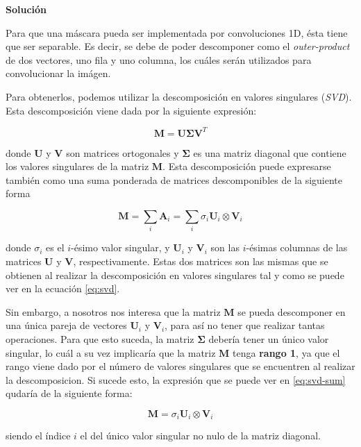 \documentclass[11pt,a4paper]{article}
\newcommand{\answer}{\noindent\textbf{Solución}}
\begin{document}
\answer

Para que una máscara pueda ser implementada por convoluciones 1D, ésta tiene que ser separable. Es decir, se debe de poder
descomponer como el \textit{outer-product} de dos vectores, uno fila y uno columna, los cuáles serán utilizados para
convolucionar la imágen.

Para obtenerlos, podemos utilizar la descomposición en valores singulares (\textit{SVD}). Esta descomposición viene dada
por la siguiente expresión:

\begin{equation}
\label{eq:svd}
	\mathbf{M} = \mathbf{U} \mathbf{\Sigma} \mathbf{V}^T
\end{equation}

\noindent donde $\mathbf{U}$ y $\mathbf{V}$ son matrices ortogonales y $\mathbf{\Sigma}$ es una matriz diagonal que contiene
los valores singulares de la matriz $\mathbf{M}$. Esta descomposición puede expresarse también como una suma ponderada de
matrices descomponibles de la siguiente forma\cite{bib:svd}

\begin{equation}
\label{eq:svd-sum}
	\mathbf{M} = \sum_i \mathbf{A}_i = \sum_i \sigma_i \mathbf{U}_i \otimes \mathbf{V}_i
\end{equation}

\noindent donde $\sigma_i$ es el $i$-ésimo valor singular, y $\mathbf{U}_i$ y $\mathbf{V}_i$ son las $i$-ésimas columnas
de las matrices $\mathbf{U}$ y $\mathbf{V}$, respectivamente. Estas dos matrices son las mismas que se obtienen al realizar
la descomposición en valores singulares tal y como se puede ver en la ecuación \eqref{eq:svd}.

Sin embargo, a nosotros nos interesa que la matriz $\mathbf{M}$ se pueda descomponer en una única pareja de vectores
$\mathbf{U}_i$ y $\mathbf{V}_i$, para así no tener que realizar tantas operaciones. Para que esto suceda,
la matriz $\mathbf{\Sigma}$ debería tener un único valor singular, lo cuál a su vez implicaría que la matriz $\mathbf{M}$
tenga \textbf{rango 1}, ya que el rango viene dado por el número de valores singulares que se encuentren al realizar la
descomposicion. Si sucede esto, la expresión que se puede ver en \eqref{eq:svd-sum} qudaría de la siguiente forma:

\begin{equation}
	\mathbf{M} = \sigma_i \mathbf{U}_i \otimes \mathbf{V}_i
\end{equation}

\noindent siendo el índice $i$ el del único valor singular no nulo de la matriz diagonal.
\end{document}
